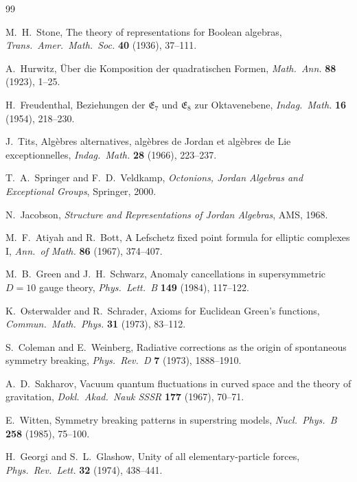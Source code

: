 \begin{thebibliography}{99}

M.~H.~Stone,
The theory of representations for Boolean algebras,
\emph{Trans.\ Amer.\ Math.\ Soc.} \textbf{40} (1936), 37--111.

A.~Hurwitz,
\"Uber die Komposition der quadratischen Formen,
\emph{Math.\ Ann.} \textbf{88} (1923), 1--25.

H.~Freudenthal,
Beziehungen der $\mathfrak{E}_7$ und $\mathfrak{E}_8$ zur Oktavenebene,
\emph{Indag.\ Math.} \textbf{16} (1954), 218--230.

J.~Tits,
Alg\`ebres alternatives, alg\`ebres de Jordan et alg\`ebres de Lie
exceptionnelles,
\emph{Indag.\ Math.} \textbf{28} (1966), 223--237.

T.~A.~Springer and F.~D.~Veldkamp,
\emph{Octonions, Jordan Algebras and Exceptional Groups},
Springer, 2000.

N.~Jacobson,
\emph{Structure and Representations of Jordan Algebras},
AMS, 1968.

M.~F.~Atiyah and R.~Bott,
A Lefschetz fixed point formula for elliptic complexes I,
\emph{Ann.\ of Math.} \textbf{86} (1967), 374--407.

M.~B.~Green and J.~H.~Schwarz,
Anomaly cancellations in supersymmetric $D=10$ gauge theory,
\emph{Phys.\ Lett.\ B} \textbf{149} (1984), 117--122.

K.~Osterwalder and R.~Schrader,
Axioms for Euclidean Green's functions,
\emph{Commun.\ Math.\ Phys.} \textbf{31} (1973), 83--112.

S.~Coleman and E.~Weinberg,
Radiative corrections as the origin of spontaneous symmetry breaking,
\emph{Phys.\ Rev.\ D} \textbf{7} (1973), 1888--1910.

A.~D.~Sakharov,
Vacuum quantum fluctuations in curved space and the theory of gravitation,
\emph{Dokl.\ Akad.\ Nauk SSSR} \textbf{177} (1967), 70--71.

E.~Witten,
Symmetry breaking patterns in superstring models,
\emph{Nucl.\ Phys.\ B} \textbf{258} (1985), 75--100.

H.~Georgi and S.~L.~Glashow,
Unity of all elementary-particle forces,
\emph{Phys.\ Rev.\ Lett.} \textbf{32} (1974), 438--441.


\end{thebibliography}

